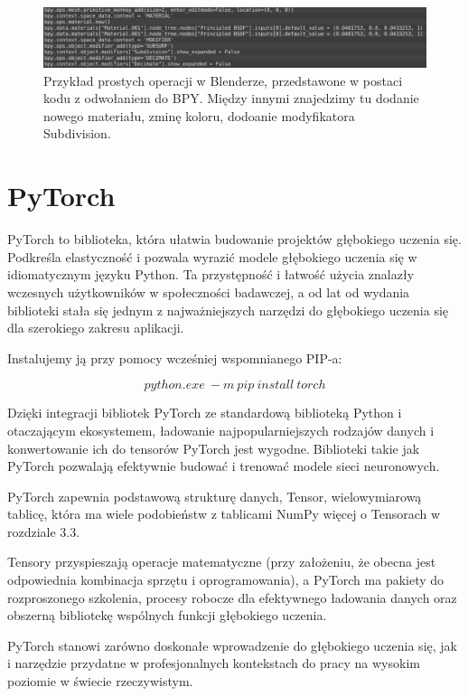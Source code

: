 \documentclass[brudnopis]{xmgr}
\begin{document}
  
  \begin{figure}[!tbh]
\centering
\includegraphics[width=1.2\hsize]{fig/8}
\caption{Przykład prostych operacji w Blenderze, przedstawone w postaci kodu z odwołaniem do BPY. Między innymi znajedzimy tu dodanie nowego materiału, zminę koloru, dodoanie modyfikatora Subdivision.\label{RYS.3}}
\end{figure}
  
    \section{PyTorch\label{s:dsssl}}
    
    
PyTorch to biblioteka, która ułatwia budowanie projektów głębokiego uczenia się. Podkreśla elastyczność i pozwala wyrazić modele głębokiego uczenia się w idiomatycznym języku Python. Ta przystępność i łatwość użycia znalazły wczesnych użytkowników w społeczności badawczej, a od lat od wydania biblioteki stała się jednym z najważniejszych narzędzi do głębokiego uczenia się dla szerokiego zakresu aplikacji.

Instalujemy ją przy pomocy wcześniej wspomnianego PIP-a:

\begin{equation}
python.exe\:-m\:pip\:install\:torch
\end{equation}

Dzięki integracji bibliotek PyTorch ze standardową biblioteką Python i otaczającym ekosystemem, ładowanie najpopularniejszych rodzajów danych i konwertowanie ich do tensorów PyTorch jest wygodne.􏰹Biblioteki takie jak PyTorch pozwalają efektywnie budować i trenować modele sieci neuronowych.

PyTorch zapewnia podstawową strukturę danych, Tensor, wielowymiarową tablicę, która ma wiele podobieństw z tablicami NumPy więcej o Tensorach w rozdziale 3.3.

 Tensory przyspieszają operacje matematyczne (przy założeniu, że obecna jest odpowiednia kombinacja sprzętu i oprogramowania), a PyTorch ma pakiety do rozproszonego szkolenia, procesy robocze dla efektywnego ładowania danych oraz obszerną bibliotekę wspólnych funkcji głębokiego uczenia.

PyTorch stanowi zarówno doskonałe wprowadzenie do głębokiego uczenia się, jak i narzędzie przydatne w profesjonalnych kontekstach do pracy na wysokim poziomie w świecie rzeczywistym.
\end{document}
